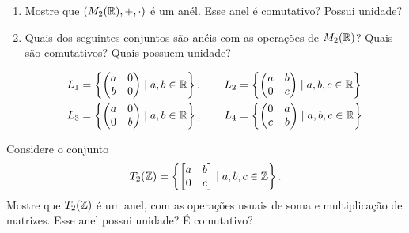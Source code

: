 \documentclass[12pt]{exam}
\begin{document}
    \begin{enumerate}[label=({\alph*})]
        \item Mostre que $(M_2(\mathbb{R}), + , \cdot)$ \'e um an\'el. Esse anel \'e comutativo? Possui unidade?
        \item Quais dos seguintes conjuntos s\~ao an\'eis com as opera\c{c}\~oes de $M_2(\mathbb{R})$? Quais s\~ao comutativos? Quais possuem unidade?

        \begin{align*}
            L_1 &= \left\{\begin{pmatrix}
                a & 0\\
                b & 0
            \end{pmatrix} \mid a, b \in \mathbb{R}\right\},\qquad
            L_2 = \left\{\begin{pmatrix}
                a & b\\
                0 & c
            \end{pmatrix} \mid a, b, c \in \mathbb{R}\right\}\\
            L_3 &= \left\{\begin{pmatrix}
                a & 0\\
                0 & b
            \end{pmatrix} \mid a, b \in \mathbb{R}\right\},\qquad
            L_4 = \left\{\begin{pmatrix}
                0 & a\\
                c & b
            \end{pmatrix} \mid a, b, c \in \mathbb{R}\right\}
        \end{align*}
    \end{enumerate}

    \vspace{.3cm}

    \questao{} Considere o conjunto
    \[
     T_2(\mathbb{Z}) = \left\{\begin{bmatrix}a & b\\ 0 & c\end{bmatrix} \mid a, b, c \in \mathbb{Z}\right\}.
    \]
    Mostre que $T_2(\mathbb{Z})$ é um anel, com as operações usuais de soma e multiplicação de matrizes. Esse anel possui unidade? É comutativo?

    \vspace{.3cm}
\end{document}
